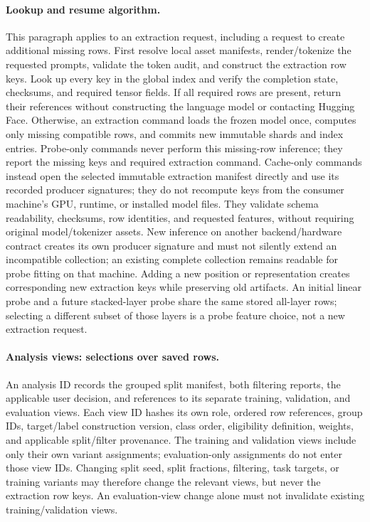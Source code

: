 \documentclass[11pt]{article}
\begin{document}
\paragraph{Lookup and resume algorithm.}
This paragraph applies to an extraction request, including a request to create additional missing rows.
First resolve local asset manifests, render/tokenize the requested prompts, validate the token audit, and construct the extraction row keys.
Look up every key in the global index and verify the completion state, checksums, and required tensor fields.
If all required rows are present, return their references without constructing the language model or contacting Hugging Face.
Otherwise, an extraction command loads the frozen model once, computes only missing compatible rows, and commits new immutable shards and index entries.
Probe-only commands never perform this missing-row inference; they report the missing keys and required extraction command.
Cache-only commands instead open the selected immutable extraction manifest directly and use its recorded producer signatures; they do not recompute keys from the consumer machine's GPU, runtime, or installed model files.
They validate schema readability, checksums, row identities, and requested features, without requiring original model/tokenizer assets.
New inference on another backend/hardware contract creates its own producer signature and must not silently extend an incompatible collection; an existing complete collection remains readable for probe fitting on that machine.
Adding a new position or representation creates corresponding new extraction keys while preserving old artifacts.
An initial linear probe and a future stacked-layer probe share the same stored all-layer rows; selecting a different subset of those layers is a probe feature choice, not a new extraction request.

\paragraph{Analysis views: selections over saved rows.}
An analysis ID records the grouped split manifest, both filtering reports, the applicable user decision, and references to its separate training, validation, and evaluation views.
Each view ID hashes its own role, ordered row references, group IDs, target/label construction version, class order, eligibility definition, weights, and applicable split/filter provenance.
The training and validation views include only their own variant assignments; evaluation-only assignments do not enter those view IDs.
Changing split seed, split fractions, filtering, task targets, or training variants may therefore change the relevant views, but never the extraction row keys.
An evaluation-view change alone must not invalidate existing training/validation views.
\end{document}
